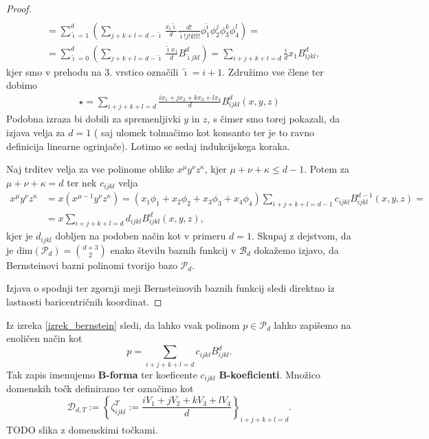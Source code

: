 \documentclass[11pt,a4paper]{article}
\begin{document}
\begin{proof}
\begin{align*}
            \\ & = \sum_{\tilde{\imath} = 1}^{d} \left(  \sum_{j+k+l = d-\tilde{\imath}} \frac{x_i \tilde{\imath}}{d} \frac{d!}{\tilde{\imath}! j!k!l!}     \phi_1^{\tilde{\imath}} \phi_2^j \phi_3^k \phi_4^l  \right) = 
            \\ & = \sum_{\tilde{\imath} = 0}^{d} \left( \sum_{j+k+l = d- \tilde{\imath}} \frac{\tilde{\imath} x_1}{d} B_{\tilde{\imath}jkl}^d\right) = 
            \sum_{i+j+k+l = d} \frac{i}{d} x_1 B_{ijkl}^d,
    \end{align*}
    kjer smo v prehodu na 3. vrstico označili $\tilde{\imath} = i+1$. Združimo vse člene ter 
    dobimo 
    \begin{align}
         \star
        = \sum_{i+j+k+l = d} \frac{ix_1 + jx_2 + k x_3 +l x_4}{d} B_{ijkl}^d(x,y,z)
    \end{align}
    Podobna izraza bi dobili 
    za spremenljivki $y$ in $z$, s čimer smo torej pokazali, 
    da izjava velja za $d = 1$ ( saj ulomek tolmačimo kot konsanto 
    ter je to ravno definicija linearne ogrinjače). Lotimo se sedaj indukcijskega koraka. 

    Naj trditev velja za vse polinome oblike $x^\mu y^\nu z^\kappa$, 
    kjer $\mu + \nu + \kappa \leq  d-1$. Potem za $\mu + \nu + \kappa =  d$ ter 
    nek $c_{ijkl}$ velja  
    \begin{align*}
        x^\mu y^\nu z^\kappa &= x \left(x^{\mu-1} y^\nu z^\kappa\right) = 
        \left(x_1 \phi_1 + x_2 \phi_2 + x_3 \phi_3 +x_4 \phi_4 \right) \sum_{i+j+k+l = d-1}c_{ijkl} B_{ijkl}^{d-1}(x,y,z) =
        \\ & =  x \sum_{i+j+k+l = d}d_{ijkl} B_{ijkl}^{d}(x,y,z)
        ,
    \end{align*}
    kjer je $d_{ijkl}$ dobljen na podoben način kot v primeru $d = 1$. Skupaj z dejstvom, 
    da je $\text{dim}\left(\mathcal{P}_d \right)=  \binom{d+3}{2}$ enako številu baznih funkcij 
    v $\mathcal{B}_d$ dokažemo izjavo, da Bernsteinovi bazni polinomi tvorijo 
    bazo $\mathcal{P}_d$. 

    Izjava o spodnji ter zgornji meji Bernsteinovih baznih funkcij sledi direktno iz
    lastnosti baricentričnih koordinat.
\end{proof}

Iz izreka \ref{izrek_bernstein} sledi, da lahko vsak polinom $p \in \mathcal{P}_d$
lahko zapišemo na enoličen način kot
\begin{equation}\label{eq_Bforma}
    p = \sum_{i+j+k+l = d} c_{ijkl} B_{ijkl}^d.
\end{equation}
Tak zapis imenujemo \textbf{B-forma} ter koeficente $c_{ijkl}$ \textbf{B-koeficienti}.
Množico domenskih točk definiramo ter označimo kot
\begin{equation}
    \mathcal{D}_{d,T} := 
    \left\{
        \zeta_{ijkl}^T:= \frac{i V_1 + j V_2 + k V_3 + l V_4}{d}
     \right\}_{i + j+ k+l = d}.
\end{equation}
TODO slika z domenskimi točkami.
\end{document}
